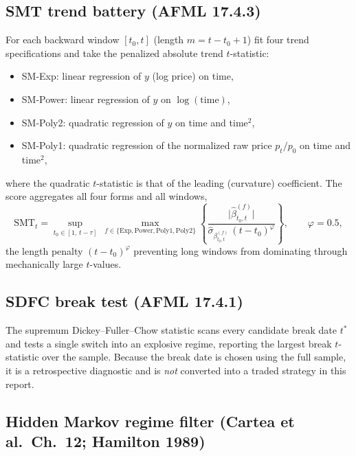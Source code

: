 \documentclass[11pt]{article}
\begin{document}
\subsection{SMT trend battery (AFML 17.4.3)}

For each backward window $[t_0,t]$ (length $m=t-t_0+1$) fit four trend specifications and take the penalized absolute trend $t$-statistic:
\begin{itemize}
    \item SM-Exp: linear regression of $y$ (log price) on time,
    \item SM-Power: linear regression of $y$ on $\log(\mathrm{time})$,
    \item SM-Poly2: quadratic regression of $y$ on time and time$^2$,
    \item SM-Poly1: quadratic regression of the normalized raw price $p_t/p_0$ on time and time$^2$,
\end{itemize}
where the quadratic $t$-statistic is that of the leading (curvature) coefficient. The score aggregates all four forms and all windows,
\[
    \mathrm{SMT}_t = \sup_{t_0 \in [1,\,t-\tau]}\ \max_{f\in\{\mathrm{Exp,Power,Poly1,Poly2}\}}
    \left\{ \frac{\big\lvert \hat\beta^{(f)}_{t_0,t}\big\rvert}{\hat\sigma_{\beta^{(f)}_{t_0,t}}\,(t-t_0)^{\varphi}} \right\},
    \qquad \varphi = 0.5,
\]
the length penalty $(t-t_0)^{\varphi}$ preventing long windows from dominating through mechanically large $t$-values.

\subsection{SDFC break test (AFML 17.4.1)}

The supremum Dickey--Fuller--Chow statistic scans every candidate break date $t^\ast$ and tests a single switch into an explosive regime, reporting the largest break $t$-statistic over the sample. Because the break date is chosen using the full sample, it is a retrospective diagnostic and is \emph{not} converted into a traded strategy in this report.

\subsection{Hidden Markov regime filter (Cartea et al.\ Ch.~12; Hamilton 1989)}
\end{document}
